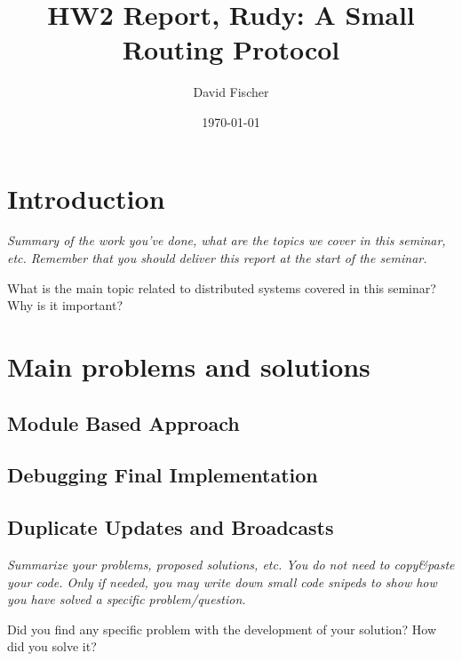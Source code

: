 \documentclass[a4paper, 11pt]{article}
\title{HW2 Report, Rudy: A Small Routing Protocol}
\author{David Fischer}
\date{\today{}}
\begin{document}
\maketitle

\section{Introduction}

\textit{Summary of the work you've done, what are the topics we cover
  in this seminar, etc. Remember that you should deliver this report
  at the start of the seminar.}

What is the main topic related to distributed systems covered in this seminar?
Why is it important?

\section{Main problems and solutions}

\subsection{Module Based Approach}


\subsection{Debugging Final Implementation}


\subsection{Duplicate Updates and Broadcasts}


\textit{Summarize your problems, proposed solutions, etc. You do not
  need to copy\&paste your code. Only if needed, you may write down
  small code snipeds to show how you have solved a specific
  problem/question.}

Did you find any specific problem with the development of your
solution?  How did you solve it?
\end{document}

